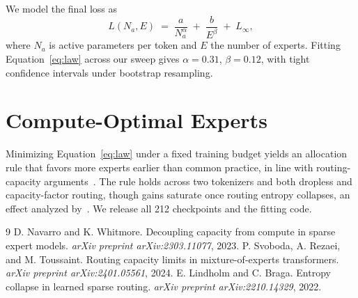 \documentclass[11pt]{article}
\begin{document}
We model the final loss as
\begin{equation}
  L(N_a, E) \;=\; \frac{a}{N_a^{\alpha}} \;+\; \frac{b}{E^{\beta}} \;+\; L_{\infty},
  \label{eq:law}
\end{equation}
where $N_a$ is active parameters per token and $E$ the number of experts.
Fitting Equation~\eqref{eq:law} across our sweep gives $\alpha = 0.31$,
$\beta = 0.12$, with tight confidence intervals under bootstrap resampling.

\section{Compute-Optimal Experts}
Minimizing Equation~\eqref{eq:law} under a fixed training budget yields an
allocation rule that favors more experts earlier than common practice, in
line with routing-capacity arguments~\cite{svoboda2024routing}. The rule
holds across two tokenizers and both dropless and capacity-factor routing,
though gains saturate once routing entropy collapses, an effect analyzed
by~\cite{lindholm2022entropy}. We release all 212 checkpoints and the
fitting code.

\begin{thebibliography}{9}
 D. Navarro and K. Whitmore.
Decoupling capacity from compute in sparse expert models.
\textit{arXiv preprint arXiv:2303.11077}, 2023.
 P. Svoboda, A. Rezaei, and M. Toussaint.
Routing capacity limits in mixture-of-experts transformers.
\textit{arXiv preprint arXiv:2401.05561}, 2024.
 E. Lindholm and C. Braga.
Entropy collapse in learned sparse routing.
\textit{arXiv preprint arXiv:2210.14329}, 2022.
\end{thebibliography}
\end{document}
